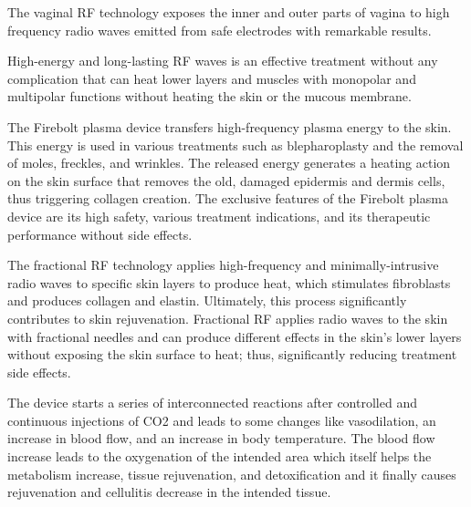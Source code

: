 \documentclass[10pt,a4paper,ragged2e,withhyper]{altacv}
\begin{document}
\begin{paracol}{2}
\divider

The vaginal RF technology exposes the inner and outer parts of vagina to high frequency radio waves emitted from safe electrodes with remarkable results.

High-energy and long-lasting RF waves is an effective treatment without any complication that can heat lower layers and muscles with monopolar and multipolar functions without heating the skin or the mucous membrane.

\divider

The Firebolt plasma device transfers high-frequency plasma energy to the skin. This energy is used in various treatments such as blepharoplasty and the removal of moles, freckles, and wrinkles. The released energy generates a heating action on the skin surface that removes the old, damaged epidermis and dermis cells, thus triggering collagen creation. The exclusive features of the Firebolt plasma device are its high safety, various treatment indications, and its therapeutic performance without side effects.

\divider

The fractional RF technology applies high-frequency and minimally-intrusive radio waves to specific skin layers to produce heat, which stimulates fibroblasts and produces collagen and elastin. Ultimately, this process significantly contributes to skin rejuvenation. Fractional RF applies radio waves to the skin with fractional needles and can produce different effects in the skin’s lower layers without exposing the skin surface to heat; thus, significantly reducing treatment side effects.

\divider

The device starts a series of interconnected reactions after controlled and continuous injections of CO2 and leads to some changes like vasodilation, an increase in blood flow, and an increase in body temperature. The blood flow increase leads to the oxygenation of the intended area which itself helps the metabolism increase, tissue rejuvenation, and detoxification and it finally causes rejuvenation and cellulitis decrease in the intended tissue.

\nocite{*}
\switchcolumn


\end{paracol}
\end{document}
